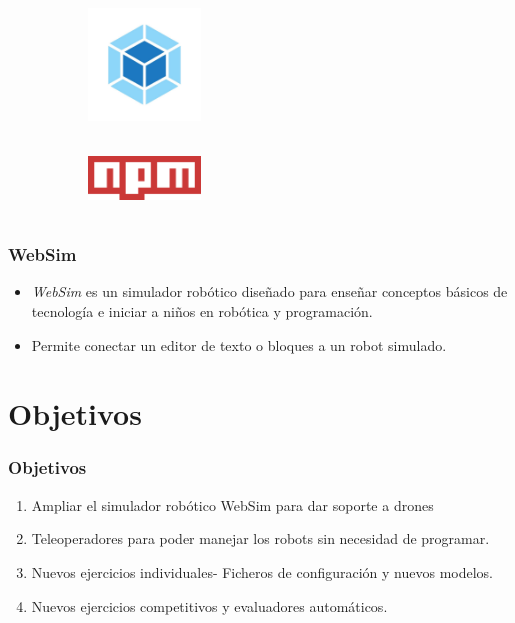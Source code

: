\documentclass[xcolor={table}]{beamer}
\begin{document}
\begin{frame}
\begin{figure}[H]
\begin{subfigure}{\textwidth}
                \label{fig:figure2_7}
                \end{subfigure}\hfill
                    \begin{subfigure}{\textwidth}
                        \includegraphics[width=3cm, height=3cm]{img/webpack.jpeg}
                    \label{fig:figure2_9}
                    \end{subfigure}\hfill
                    \begin{subfigure}{\textwidth}
                        \includegraphics[width=3cm, height=2cm]{img/npm.png}
                    \label{fig:figure2_8}
                    \end{subfigure}\hfill
                    \label{fig:herramientas}
                    \end{figure}
        \end{frame}
        
	\begin{frame}
	\frametitle{WebSim}
	\begin{itemize}
	    \item \textit{WebSim} es un simulador robótico diseñado para enseñar conceptos básicos de tecnología e iniciar a niños en robótica y programación.
	    
	    \item Permite conectar un editor de texto o bloques a un robot simulado. 
	\end{itemize}
\end{frame}
		
	\section{Objetivos}
		\begin{frame}
			\frametitle{Objetivos}
			\begin{enumerate}
				\item Ampliar el simulador robótico WebSim para dar soporte a drones
				\item Teleoperadores para poder manejar los robots sin necesidad de programar.
				\item Nuevos ejercicios individuales- Ficheros de configuración y nuevos modelos.
				\item Nuevos ejercicios competitivos y evaluadores automáticos. 
			\end{enumerate}
		\end{frame}
\end{document}
